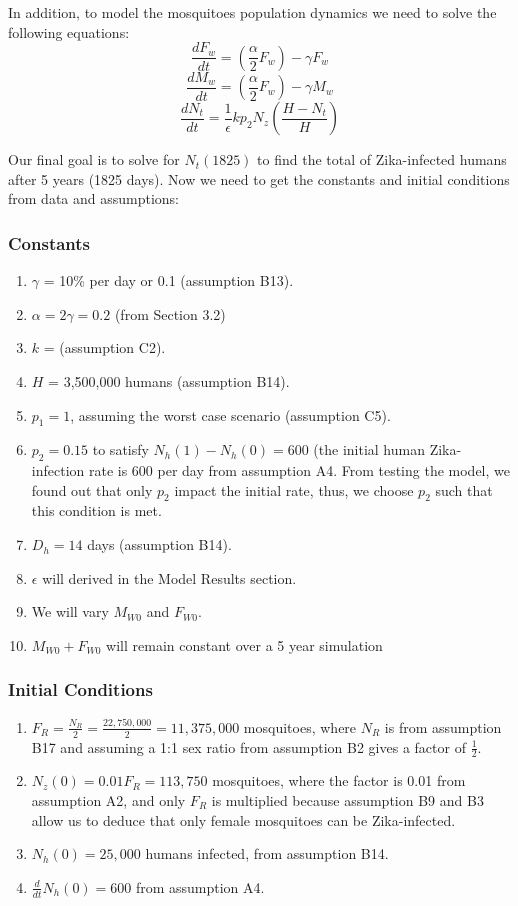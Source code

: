 \documentclass{article}
\begin{document}
In addition, to model the mosquitoes population dynamics we need to solve the following equations:
\begin{equation}
    \frac{dF_w}{dt} = (\frac{\alpha}{2}F_w)-\gamma F_w
\end{equation}
\begin{equation}
    \frac{dM_w}{dt} = (\frac{\alpha}{2}F_w)-\gamma M_w
\end{equation}
\begin{equation}
    \frac{dN_t}{dt} = \frac{1}{\epsilon}kp_2N_z (\frac{H-N_t}{H})
\end{equation}

Our final goal is to solve for $N_t(1825)$ to find the total of Zika-infected humans after 5 years (1825 days). Now we need to get the constants and initial conditions from data and assumptions:
\subsubsection{Constants}
\begin{enumerate}
    \item $\gamma$ = 10\% per day or 0.1 (assumption B13).
    \item $\alpha = 2\gamma = 0.2$  (from Section 3.2)
    \item $k$ = (assumption C2).
    \item $H$ = 3,500,000 humans (assumption B14).
    \item $p_1 = 1$, assuming the worst case scenario (assumption C5).
    \item $p_2 = 0.15$ to satisfy $N_h(1)-N_h(0)=600$ (the initial human Zika-infection rate is 600 per day from assumption A4. From testing the model, we found out that only $p_2$ impact the initial rate, thus, we choose $p_2$ such that this condition is met.
    \item $D_h = 14$ days (assumption B14).
    \item $\epsilon$ will derived in the Model Results section.
    \item We will vary $M_{W0}$ and $F_{W0}$.
    \item $M_{W0} + F_{W0}$ will remain constant over a 5 year simulation
\end{enumerate}
\subsubsection{Initial Conditions}
\begin{enumerate}
    \item $F_R = \frac{N_R}{2} = \frac{22,750,000}{2} = 11,375,000$ mosquitoes, where $N_R$ is from assumption B17 and assuming a 1:1 sex ratio from assumption B2 gives a factor of $\frac{1}{2}$.
    \item $N_z(0) = 0.01F_R = 113,750$ mosquitoes, where the factor is 0.01 from assumption A2, and only $F_R$ is multiplied because assumption B9 and B3 allow us to deduce that only female mosquitoes can be Zika-infected.
    \item $N_h(0) = 25,000$ humans infected, from assumption B14.
    \item $\frac{d}{dt}N_h(0) = 600$ from assumption A4.
\end{enumerate}
\end{document}
